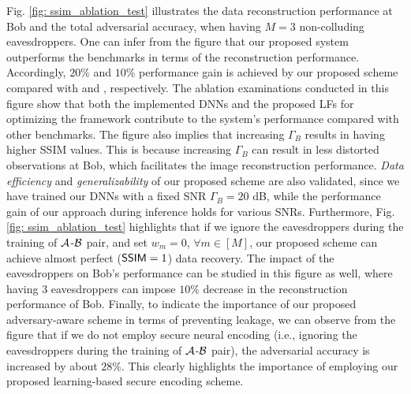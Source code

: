 \documentclass[conference]{IEEEtran}
\begin{document}
{{	\vspace{-0.5mm}
Fig. 
\ref{fig: ssim_ablation_test} 
illustrates the data   reconstruction performance at Bob and the total adversarial accuracy, when having $M=3$ non-colluding eavesdroppers.  
One can infer from the figure  that our proposed system outperforms the benchmarks in terms of the reconstruction performance. 
Accordingly, $20\%$ and $10\%$ performance gain is achieved by our proposed scheme 
compared with  \cite{AE-Deniz} and \cite{Deniz-GDN}, respectively.  
The ablation examinations conducted  in this figure show  that both the implemented DNNs   and the proposed LFs for optimizing the  framework contribute to the system's performance compared with other benchmarks.  
The figure also implies that increasing   $\Gamma_{B}$ results in having higher SSIM values. 
This is because increasing $\Gamma_{B}$ can result in   less distorted  observations at Bob,  which facilitates the image reconstruction performance.   
\emph{Data efficiency} and \emph{generalizability} of our proposed scheme are also validated, since we have trained our DNNs with a fixed SNR $\Gamma_{B} = 20$ dB, while the  performance gain  of our approach during  inference holds for various SNRs.  
Furthermore, Fig. 
\ref{fig: ssim_ablation_test} highlights that if we ignore the eavesdroppers during the training of $\cal A$-$\cal B$ pair, and set $w_m = 0$,  $\forall m\in [M]$, 
our proposed scheme can achieve almost perfect  (${\sf SSIM} = 1$) data recovery. The impact of the eavesdroppers on Bob's performance can be studied in this figure as well, where having $3$ eavesdroppers can impose $10\%$ decrease in the reconstruction performance of Bob. 
Finally, to indicate the importance  of our proposed adversary-aware scheme in terms of preventing leakage, we can observe from the figure that  if we do not employ secure neural encoding (i.e., ignoring the eavesdroppers during the training of $\cal A$-$\cal B$ pair), the adversarial accuracy is increased by about $28\%$. 
This clearly highlights the importance of employing our proposed learning-based secure encoding scheme.

 
 
}}
\end{document}
